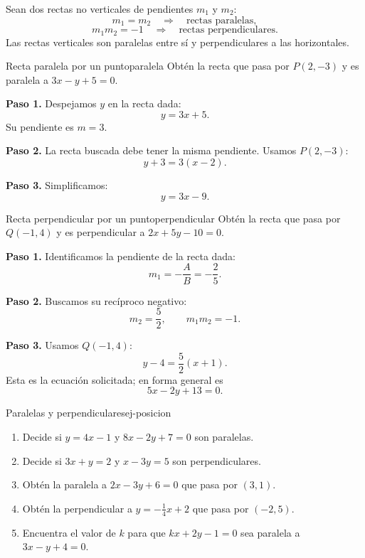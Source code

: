 \begin{properties}
Sean dos rectas no verticales de pendientes $m_1$ y $m_2$:
\[
\boxed{m_1=m_2}\quad\Longrightarrow\quad\text{rectas paralelas},
\]
\[
\boxed{m_1m_2=-1}\quad\Longrightarrow\quad\text{rectas perpendiculares}.
\]
Las rectas verticales son paralelas entre sí y perpendiculares a las
horizontales.
\end{properties}

\begin{example}{Recta paralela por un punto}{paralela}
Obtén la recta que pasa por $P(2,-3)$ y es paralela a $3x-y+5=0$.
\begin{solution}
\textbf{Paso 1.} Despejamos $y$ en la recta dada:
\[
y=3x+5.
\]
Su pendiente es $m=3$.

\textbf{Paso 2.} La recta buscada debe tener la misma pendiente. Usamos
$P(2,-3)$:
\[
y+3=3(x-2).
\]

\textbf{Paso 3.} Simplificamos:
\[
\boxed{y=3x-9}.
\]
\end{solution}
\end{example}

\begin{example}{Recta perpendicular por un punto}{perpendicular}
Obtén la recta que pasa por $Q(-1,4)$ y es perpendicular a
$2x+5y-10=0$.
\begin{solution}
\textbf{Paso 1.} Identificamos la pendiente de la recta dada:
\[
m_1=-\frac AB=-\frac25.
\]

\textbf{Paso 2.} Buscamos su recíproco negativo:
\[
m_2=\frac52,\qquad m_1m_2=-1.
\]

\textbf{Paso 3.} Usamos $Q(-1,4)$:
\[
y-4=\frac52(x+1).
\]
Esta es la ecuación solicitada; en forma general es
\[
\boxed{5x-2y+13=0}.
\]
\end{solution}
\end{example}

\begin{exercise}{Paralelas y perpendiculares}{ej-posicion}
\begin{enumerate}[label=\alph*)]
  \item Decide si $y=4x-1$ y $8x-2y+7=0$ son paralelas.
  \item Decide si $3x+y=2$ y $x-3y=5$ son perpendiculares.
  \item Obtén la paralela a $2x-3y+6=0$ que pasa por $(3,1)$.
  \item Obtén la perpendicular a $y=-\frac14x+2$ que pasa por $(-2,5)$.
  \item Encuentra el valor de $k$ para que $kx+2y-1=0$ sea paralela a
  $3x-y+4=0$.
\end{enumerate}
\end{exercise}


